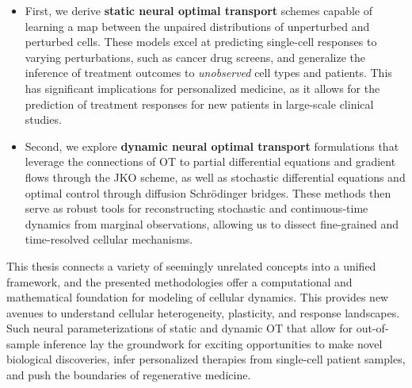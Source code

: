 \begin{itemize}[leftmargin=*]
	\item First, we derive \textbf{static neural optimal transport} schemes capable of learning a map between the unpaired distributions of unperturbed and perturbed cells. These models excel at predicting single-cell responses to varying perturbations, such as cancer drug screens, and generalize the inference of treatment outcomes to \emph{unobserved} cell types and patients.
This has significant implications for personalized medicine, as it allows for the prediction of treatment responses for new patients in large-scale clinical studies.

	\item Second, we explore \textbf{dynamic neural optimal transport} formulations that leverage the connections of OT to partial differential equations and gradient flows through the \acrfull{JKO} scheme, as well as stochastic differential equations and optimal control through diffusion Schr{\"o}dinger bridges. These methods then serve as robust tools for reconstructing stochastic and continuous-time dynamics from marginal observations, allowing us to dissect fine-grained and time-resolved cellular mechanisms.
\end{itemize}

This thesis connects a variety of seemingly unrelated concepts into a unified framework, and the presented methodologies offer a computational and mathematical foundation for modeling of cellular dynamics. This provides new avenues to understand cellular heterogeneity, plasticity, and response landscapes.
Such neural parameterizations of static and dynamic OT that allow for out-of-sample inference lay the groundwork for exciting opportunities to make novel biological discoveries, infer personalized  therapies from single-cell patient samples, and push the boundaries of regenerative medicine.

\endgroup

\cleardoublepage%

\begingroup
\let\clearpage\relax
\let\cleardoublepage\relax
\let\cleardoublepage\relax

